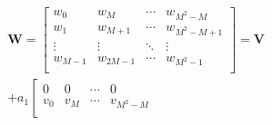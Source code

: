 \begin{equation}
    \label{eq:ZIC_wo_trans}
    \begin{aligned}
        &\bm{W} = \left[\begin{array}{c|c|c|c}
            w_0 & w_M & \cdots & w_{M^2-M} \\ 
            w_1 & w_{M+1} & \cdots & w_{M^2-M+1} \\
            \vdots & \vdots & \ddots & \vdots \\
            w_{M-1} & w_{2M-1} &\cdots & w_{M^2-1} \\
            \end{array}\right] = \bm{V} \\
            &+ a_1\left[\begin{array}{c|c|c|c}
                0 & 0 & \cdots & 0 \\ 
                v_0 & v_M & \cdots & v_{M^2-M} \\

\end{array}
\end{aligned}
\end{equation}
